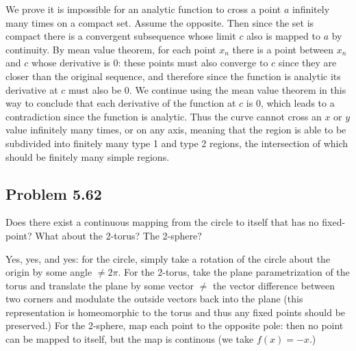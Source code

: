 \documentclass{amsart}
\begin{document}
\medskip \noindent We prove it is impossible for an analytic function to cross a point $a$ infinitely many times on
a compact set. Assume the opposite. Then since the set is compact there is a convergent subsequence whose limit $c$ also
is mapped to $a$ by continuity. By mean value theorem, for each point $x_n$ there is a point between $x_n$ and $c$ whose
derivative is $0$: these points must also converge to $c$ since they are closer than the original sequence, and therefore
since the function is analytic its derivative at $c$ must also be $0$. We continue using the mean value theorem in this way
to conclude that each derivative of the function at $c$ is $0$, which leads to a contradiction since the function is analytic.
Thus the curve cannot cross an $x$ or $y$ value infinitely many times, or on any axis, meaning that the region
is able to be subdivided into finitely many type 1 and type 2 regions, the intersection of which should be finitely many
simple regions. 

\newpage

\subsection*{Problem 5.62} Does there exist a continuous mapping from the circle to itself that has no fixed-point? What about the 2-torus? The 2-sphere?

\medskip \noindent Yes, yes, and yes: for the circle, simply take a rotation of the circle about the origin by some
angle $\neq 2\pi$. For the 2-torus, take the plane parametrization of the torus and translate the plane by some vector
$\neq$ the vector difference between two corners and modulate the outside vectors back into the plane
(this representation is homeomorphic to the torus and thus any fixed points should be preserved.)
For the 2-sphere, map each point to the opposite pole: then no point can be mapped to itself, but
the map is continous (we take $f(x)=-x$.)

\newpage
\end{document}
